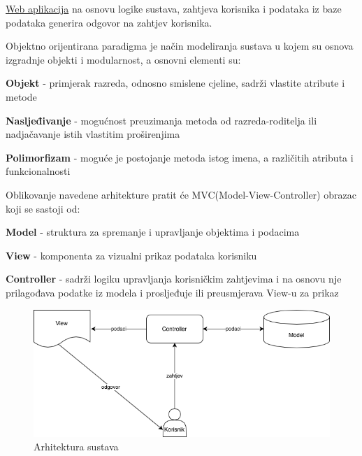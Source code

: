 		\underline{Web aplikacija} na osnovu logike sustava, zahtjeva korisnika i podataka iz baze podataka generira odgovor na zahtjev korisnika.
		
		Objektno orijentirana paradigma je način modeliranja sustava u kojem su osnova izgradnje objekti i modularnost, a osnovni elementi su:
		
			\begin{packed_item}
			
			\item \textbf{Objekt }- primjerak razreda, odnosno smislene cjeline, sadrži vlastite atribute i metode
			\item \textbf {Nasljeđivanje }- mogućnost preuzimanja metoda od razreda-roditelja ili nadjačavanje istih vlastitim proširenjima
			\item \textbf{Polimorfizam }- moguće je postojanje metoda istog imena, a različitih atributa i funkcionalnosti 
			\end{packed_item}
		
		Oblikovanje navedene arhitekture pratit će MVC(Model-View-Controller) obrazac koji se sastoji od:
		
			\begin{packed_item}
				\item \textbf{Model }- struktura za spremanje i upravljanje objektima i podacima
				\item \textbf{View }- komponenta za vizualni prikaz podataka korisniku
				\item \textbf{Controller }- sadrži logiku upravljanja korisničkim zahtjevima i na osnovu nje prilagođava podatke iz modela i prosljeđuje ili preusmjerava View-u za prikaz 
			\end{packed_item}
		
		\begin{figure}[H]
			\centering
			\includegraphics[scale=0.5]{slike/mvc.png}
			\caption{Arhitektura sustava}
		\end{figure}
	
